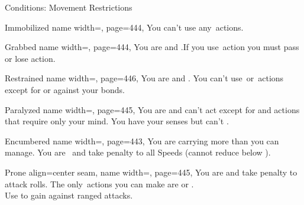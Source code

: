 \begin{PageFrontLandscape}
\begin{TablesHalf}{\frontTableHeight}
\begin{Table}{Conditions: Movement Restrictions}
            \begin{entry}{Immobilized}{%
                name width=\conditionLength,%
                page=444,
            }
                You can't use any \Move\,actions.\hfill
            \end{entry}
            \begin{entry}{Grabbed}{%
                name width=\conditionLength,%
                page=444,
            }
                You are \OffGuard and \Immobilized.\hfill If you use \Manipulate\,action you must pass \Flat[][val=5] or lose action.
            \end{entry}
            \begin{entry}{Restrained}{%
                name width=\conditionLength,%
                page=446,
            }
                You are \OffGuard and \Immobilized.
                You can't use \Attack\,or \Manipulate\,actions except for  or  against your bonds. \hfill
            \end{entry}
            \begin{entry}{Paralyzed}{%
                name width=\conditionLength,%
                page=445,
            }
                You are \OffGuard and can't act except for  and actions that require only your mind.\hfill
                You have your senses but can't .
            \end{entry}
            \breakLine
            \begin{entry}{Encumbered}{%
                name width=\conditionLength,%
                page=443,
            }
                You are carrying more than you can manage. \hfill
                You are \Clumsy\, and take  penalty to all Speeds {(cannot reduce below  \Feet)}.
            \end{entry}
            \begin{entry}{Prone}{%
                align=center seam,
                name width=\conditionLength,%
                page=445,
            }
                You are \OffGuard and take  \Cirm penalty to attack rolls. \hfill
                The only \Move\,actions you can make are  or .\\
                Use  to gain \GCover against ranged attacks. \hfill

\end{entry}
\end{Table}
\end{TablesHalf}
\end{PageFrontLandscape}
